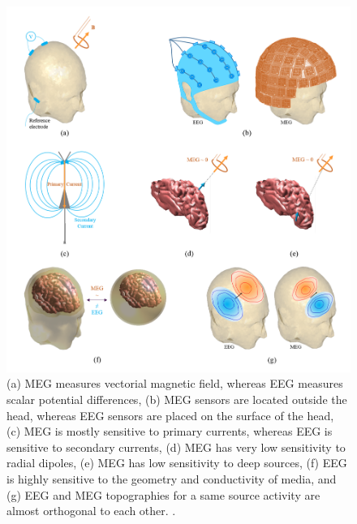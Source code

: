 \begin{figure}[!b]
\centering
\includegraphics[width=1\textwidth]{images/Complementarities.png} %
\caption{(a) MEG measures vectorial magnetic field, whereas EEG measures scalar potential differences, (b) MEG sensors are located outside the head, whereas EEG sensors are placed on the surface of the head, (c) MEG is mostly sensitive to primary currents, whereas EEG is sensitive to secondary currents, (d) MEG has very low sensitivity to radial dipoles, (e) MEG has low sensitivity to deep sources, (f) EEG is highly sensitive to the geometry and conductivity of media, and (g) EEG and MEG topographies for a same source activity are almost orthogonal to each other.
.}
\label{fig:Complementarities}
\end{figure}
\FloatBarrier